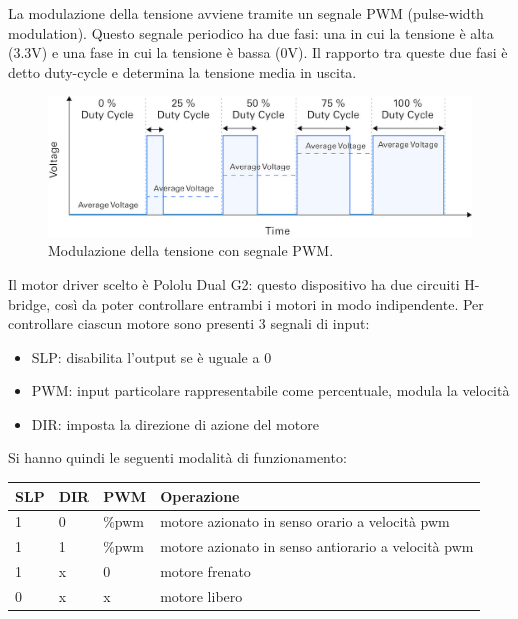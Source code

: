 La modulazione della tensione avviene tramite un segnale PWM (pulse-width modulation). Questo segnale periodico ha due fasi: una in cui la tensione è alta (3.3V) e una fase in cui la tensione è bassa (0V). Il rapporto tra queste due fasi è detto duty-cycle e determina la tensione media in uscita.

\begin{figure}[H]
\centering
\includegraphics[width=\textwidth]{images/pwm.jpg}
\caption{Modulazione della tensione con segnale PWM.}
\label{fig:pwm}
\end{figure}


Il motor driver scelto è Pololu Dual G2: questo dispositivo ha due circuiti H-bridge, così da poter controllare entrambi i motori in modo indipendente.
Per controllare ciascun motore sono presenti 3 segnali di input:
\begin{itemize}
    \item SLP: disabilita l'output se è uguale a 0
    \item PWM: input particolare rappresentabile come percentuale, modula la velocità
    \item DIR: imposta la direzione di azione del motore
\end{itemize}

Si hanno quindi le seguenti modalità di funzionamento:
\begin{table}[H]
    \centering
    \begin{tabular}{|l|l|l|l|}
    \hline
    SLP & DIR & PWM & Operazione                            \\ \hline
    1   & 0   & \%pwm & motore azionato in senso orario a velocità pwm \\
    1   & 1   & \%pwm & motore azionato in senso antiorario a velocità pwm         \\
    1   & x   & 0   & motore frenato                        \\
    0   & x   & x   & motore libero                     \\ \hline
    \end{tabular}
\end{table}

